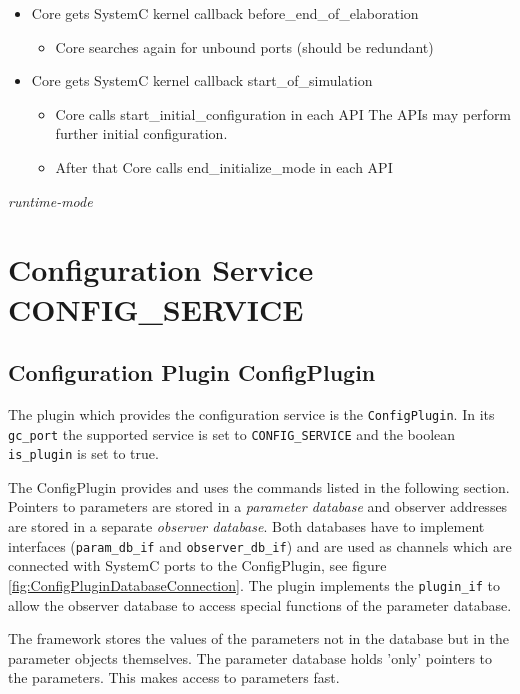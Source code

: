 \begin{itemize}
	\item Core gets SystemC kernel callback before\_end\_of\_elaboration
	\begin{itemize}
		\item Core searches again for unbound ports (should be redundant)
	\end{itemize}

	\item Core gets SystemC kernel callback start\_of\_simulation
	\begin{itemize}
		\item Core calls start\_initial\_configuration in each API  \newline The APIs may perform further initial configuration.
		\item After that Core calls end\_initialize\_mode in each API
	\end{itemize}
\end{itemize}

{\em runtime-mode}


\section{Configuration Service CONFIG\_SERVICE}

\subsection{Configuration Plugin ConfigPlugin}
\label{ConfigPlugin}

The plugin which provides the configuration service is the \lstinline|ConfigPlugin|. In its \lstinline|gc_port| the supported service is set to \lstinline|CONFIG_SERVICE| and the boolean \lstinline|is_plugin| is set to true.

The ConfigPlugin provides and uses the commands listed in the following section. Pointers to parameters are stored in a \emph{parameter database} and observer addresses are stored in a separate \emph{observer database}. Both databases have to implement interfaces (\lstinline|param_db_if| and \lstinline|observer_db_if|) and are used as channels which are connected with SystemC ports to the ConfigPlugin, see figure \ref{fig:ConfigPluginDatabaseConnection}. The plugin implements the \lstinline|plugin_if| to allow the observer database to access special functions of the parameter database.

The framework stores the values of the parameters not in the database but in the parameter objects themselves. The parameter database holds 'only' pointers to the parameters. This makes access to parameters fast.


